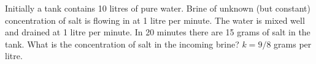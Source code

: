 {Initially a tank contains 10 litres of pure water.
Brine of unknown (but constant) concentration
of salt is flowing in at 1 litre per minute.
The water is mixed well and drained at 1 litre per minute.
In 20 minutes there are 15 grams of salt in the tank.  What is the
concentration of salt in the incoming brine?}
{$k=9/8$ grams per litre.}